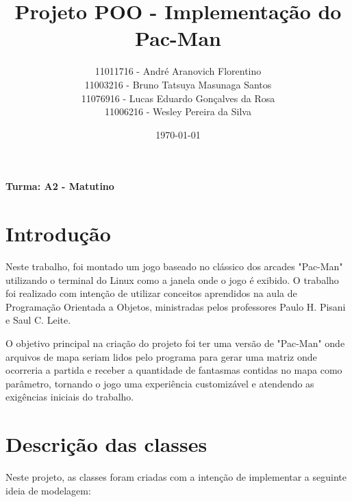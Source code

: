 \documentclass[]{article}
\title{Projeto POO - Implementação do Pac-Man}
\author{11011716 - André Aranovich Florentino\\ 11003216 - Bruno Tatsuya Masunaga Santos\\ 11076916 - Lucas Eduardo Gonçalves da Rosa\\ 11006216 - Wesley Pereira da Silva}
\date{\today}
\begin{document}
\maketitle

\centerline{\textbf{Turma: A2 - Matutino}}

\section{Introdução}

Neste trabalho, foi montado um jogo baseado no clássico dos arcades "Pac-Man" utilizando o terminal do Linux como a janela onde o jogo é exibido. O trabalho foi realizado com intenção de utilizar conceitos aprendidos na aula de Programação Orientada a Objetos, ministradas pelos professores Paulo H. Pisani e Saul C. Leite.

O objetivo principal na criação do projeto foi ter uma versão de "Pac-Man" onde arquivos de mapa seriam lidos pelo programa para gerar uma matriz onde ocorreria a partida e receber a quantidade de fantasmas contidas no mapa como parâmetro, tornando o jogo uma experiência customizável e atendendo as exigências iniciais do trabalho.

\section{Descrição das classes}
Neste projeto, as classes foram criadas com a intenção de implementar a seguinte ideia de modelagem: 
\end{document}
